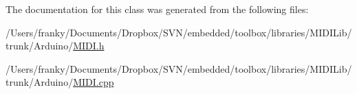 The documentation for this class was generated from the following files:\begin{CompactItemize}
\item 
/Users/franky/Documents/Dropbox/SVN/embedded/toolbox/libraries/MIDILib/trunk/Arduino/\hyperlink{_m_i_d_i_8h}{MIDI.h}\item 
/Users/franky/Documents/Dropbox/SVN/embedded/toolbox/libraries/MIDILib/trunk/Arduino/\hyperlink{_m_i_d_i_8cpp}{MIDI.cpp}\end{CompactItemize}
